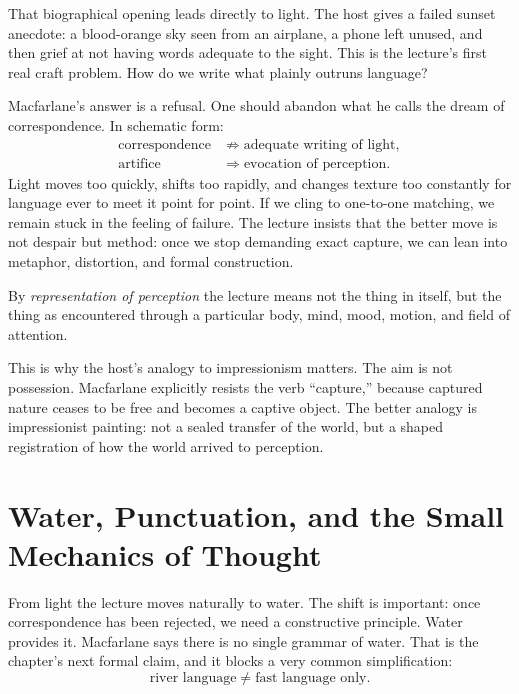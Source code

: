 That biographical opening leads directly to light. The host gives a failed sunset anecdote: a blood-orange sky seen from an airplane, a phone left unused, and then grief at not having words adequate to the sight. This is the lecture's first real craft problem. How do we write what plainly outruns language?

Macfarlane's answer is a refusal. One should abandon what he calls the dream of correspondence. In schematic form:
\begin{align}
\text{correspondence} &\not\Rightarrow \text{adequate writing of light},\\
\text{artifice} &\Rightarrow \text{evocation of perception}.
\end{align}
Light moves too quickly, shifts too rapidly, and changes texture too constantly for language ever to meet it point for point. If we cling to one-to-one matching, we remain stuck in the feeling of failure. The lecture insists that the better move is not despair but method: once we stop demanding exact capture, we can lean into metaphor, distortion, and formal construction.

\begin{definition}
By \emph{representation of perception} the lecture means not the thing in itself, but the thing as encountered through a particular body, mind, mood, motion, and field of attention.
\end{definition}

This is why the host's analogy to impressionism matters. The aim is not possession. Macfarlane explicitly resists the verb ``capture,'' because captured nature ceases to be free and becomes a captive object. The better analogy is impressionist painting: not a sealed transfer of the world, but a shaped registration of how the world arrived to perception.

\section{Water, Punctuation, and the Small Mechanics of Thought}

From light the lecture moves naturally to water. The shift is important: once correspondence has been rejected, we need a constructive principle. Water provides it. Macfarlane says there is no single grammar of water. That is the chapter's next formal claim, and it blocks a very common simplification:
\begin{equation}
\text{river language} \neq \text{fast language only}.
\end{equation}

